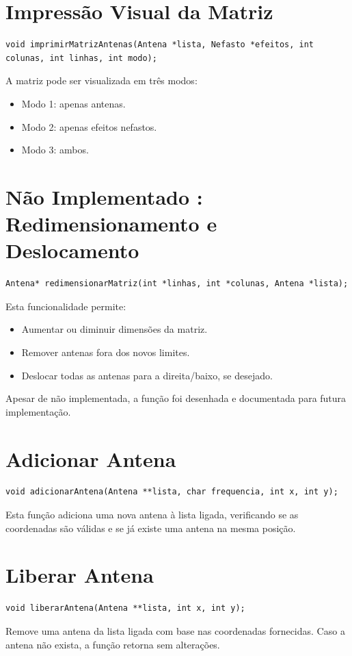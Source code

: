 \documentclass[a4paper,12pt]{report}
\begin{document}
\section{Impressão Visual da Matriz}
\begin{lstlisting}[style=CStyle]
void imprimirMatrizAntenas(Antena *lista, Nefasto *efeitos, int colunas, int linhas, int modo);
\end{lstlisting}
A matriz pode ser visualizada em três modos:
\begin{itemize}
    \item Modo 1: apenas antenas.
    \item Modo 2: apenas efeitos nefastos.
    \item Modo 3: ambos.
\end{itemize}

\section{Não Implementado : Redimensionamento e Deslocamento}
\begin{lstlisting}[style=CStyle]
Antena* redimensionarMatriz(int *linhas, int *colunas, Antena *lista);
\end{lstlisting}
Esta funcionalidade permite:
\begin{itemize}
    \item Aumentar ou diminuir dimensões da matriz.
    \item Remover antenas fora dos novos limites.
    \item Deslocar todas as antenas para a direita/baixo, se desejado.
\end{itemize}
Apesar de não implementada, a função foi desenhada e documentada para futura implementação.

\section{Adicionar Antena}
\begin{lstlisting}[style=CStyle]
void adicionarAntena(Antena **lista, char frequencia, int x, int y);
\end{lstlisting}
Esta função adiciona uma nova antena à lista ligada, verificando se as coordenadas são válidas e se já existe uma antena na mesma posição.

\section{Liberar Antena}
\begin{lstlisting}[style=CStyle]
void liberarAntena(Antena **lista, int x, int y);
\end{lstlisting}
Remove uma antena da lista ligada com base nas coordenadas fornecidas. Caso a antena não exista, a função retorna sem alterações.
\end{document}
